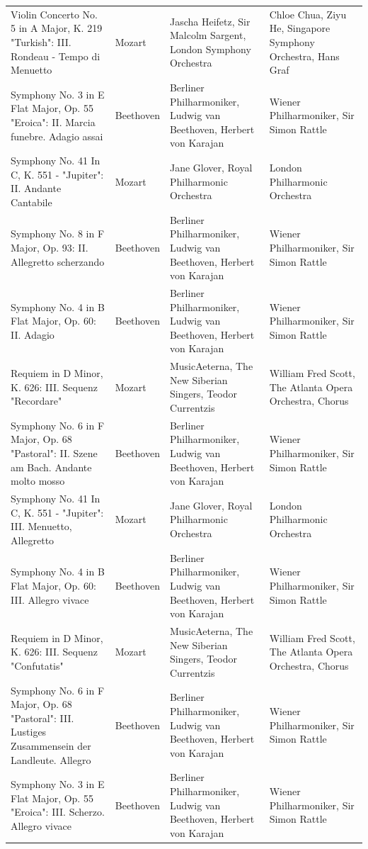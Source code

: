 \begin{longtable}{p{} p{} p{} p{}}
Violin Concerto No. 5 in A Major, K. 219 "Turkish": III. Rondeau - Tempo di Menuetto & Mozart & Jascha Heifetz, Sir Malcolm Sargent, London Symphony Orchestra & Chloe Chua, Ziyu He, Singapore Symphony Orchestra, Hans Graf \\
Symphony No. 3 in E Flat Major, Op. 55 "Eroica": II. Marcia funebre. Adagio assai & Beethoven & Berliner Philharmoniker, Ludwig van Beethoven, Herbert von Karajan & Wiener Philharmoniker, Sir Simon Rattle \\
Symphony No. 41 In C, K. 551 - "Jupiter": II. Andante Cantabile & Mozart & Jane Glover, Royal Philharmonic Orchestra & London Philharmonic Orchestra \\
Symphony No. 8 in F Major, Op. 93: II. Allegretto scherzando & Beethoven & Berliner Philharmoniker, Ludwig van Beethoven, Herbert von Karajan & Wiener Philharmoniker, Sir Simon Rattle \\
Symphony No. 4 in B Flat Major, Op. 60: II. Adagio & Beethoven & Berliner Philharmoniker, Ludwig van Beethoven, Herbert von Karajan & Wiener Philharmoniker, Sir Simon Rattle \\
Requiem in D Minor, K. 626: III. Sequenz "Recordare" & Mozart & MusicAeterna, The New Siberian Singers, Teodor Currentzis & William Fred Scott, The Atlanta Opera Orchestra, Chorus \\
Symphony No. 6 in F Major, Op. 68 "Pastoral": II. Szene am Bach. Andante molto mosso & Beethoven & Berliner Philharmoniker, Ludwig van Beethoven, Herbert von Karajan & Wiener Philharmoniker, Sir Simon Rattle \\
Symphony No. 41 In C, K. 551 - "Jupiter": III. Menuetto, Allegretto & Mozart & Jane Glover, Royal Philharmonic Orchestra & London Philharmonic Orchestra \\
Symphony No. 4 in B Flat Major, Op. 60: III. Allegro vivace & Beethoven & Berliner Philharmoniker, Ludwig van Beethoven, Herbert von Karajan & Wiener Philharmoniker, Sir Simon Rattle \\
Requiem in D Minor, K. 626: III. Sequenz "Confutatis" & Mozart & MusicAeterna, The New Siberian Singers, Teodor Currentzis & William Fred Scott, The Atlanta Opera Orchestra, Chorus \\
Symphony No. 6 in F Major, Op. 68 "Pastoral": III. Lustiges Zusammensein der Landleute. Allegro & Beethoven & Berliner Philharmoniker, Ludwig van Beethoven, Herbert von Karajan & Wiener Philharmoniker, Sir Simon Rattle \\
Symphony No. 3 in E Flat Major, Op. 55 "Eroica": III. Scherzo. Allegro vivace & Beethoven & Berliner Philharmoniker, Ludwig van Beethoven, Herbert von Karajan & Wiener Philharmoniker, Sir Simon Rattle \\

\end{longtable}
